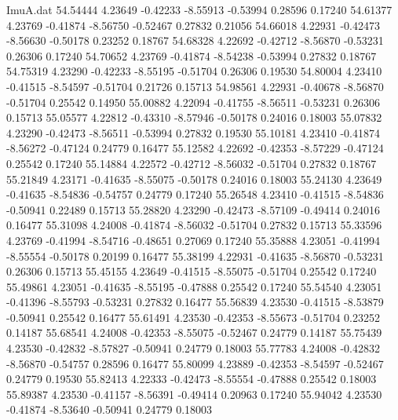 \begin{filecontents}{ImuA.dat}
  54.54444    4.23649   -0.42233   -8.55913   -0.53994    0.28596    0.17240
  54.61377    4.23769   -0.41874   -8.56750   -0.52467    0.27832    0.21056
  54.66018    4.22931   -0.42473   -8.56630   -0.50178    0.23252    0.18767
  54.68328    4.22692   -0.42712   -8.56870   -0.53231    0.26306    0.17240
  54.70652    4.23769   -0.41874   -8.54238   -0.53994    0.27832    0.18767
  54.75319    4.23290   -0.42233   -8.55195   -0.51704    0.26306    0.19530
  54.80004    4.23410   -0.41515   -8.54597   -0.51704    0.21726    0.15713
  54.98561    4.22931   -0.40678   -8.56870   -0.51704    0.25542    0.14950
  55.00882    4.22094   -0.41755   -8.56511   -0.53231    0.26306    0.15713
  55.05577    4.22812   -0.43310   -8.57946   -0.50178    0.24016    0.18003
  55.07832    4.23290   -0.42473   -8.56511   -0.53994    0.27832    0.19530
  55.10181    4.23410   -0.41874   -8.56272   -0.47124    0.24779    0.16477
  55.12582    4.22692   -0.42353   -8.57229   -0.47124    0.25542    0.17240
  55.14884    4.22572   -0.42712   -8.56032   -0.51704    0.27832    0.18767
  55.21849    4.23171   -0.41635   -8.55075   -0.50178    0.24016    0.18003
  55.24130    4.23649   -0.41635   -8.54836   -0.54757    0.24779    0.17240
  55.26548    4.23410   -0.41515   -8.54836   -0.50941    0.22489    0.15713
  55.28820    4.23290   -0.42473   -8.57109   -0.49414    0.24016    0.16477
  55.31098    4.24008   -0.41874   -8.56032   -0.51704    0.27832    0.15713
  55.33596    4.23769   -0.41994   -8.54716   -0.48651    0.27069    0.17240
  55.35888    4.23051   -0.41994   -8.55554   -0.50178    0.20199    0.16477
  55.38199    4.22931   -0.41635   -8.56870   -0.53231    0.26306    0.15713
  55.45155    4.23649   -0.41515   -8.55075   -0.51704    0.25542    0.17240
  55.49861    4.23051   -0.41635   -8.55195   -0.47888    0.25542    0.17240
  55.54540    4.23051   -0.41396   -8.55793   -0.53231    0.27832    0.16477
  55.56839    4.23530   -0.41515   -8.53879   -0.50941    0.25542    0.16477
  55.61491    4.23530   -0.42353   -8.55673   -0.51704    0.23252    0.14187
  55.68541    4.24008   -0.42353   -8.55075   -0.52467    0.24779    0.14187
  55.75439    4.23530   -0.42832   -8.57827   -0.50941    0.24779    0.18003
  55.77783    4.24008   -0.42832   -8.56870   -0.54757    0.28596    0.16477
  55.80099    4.23889   -0.42353   -8.54597   -0.52467    0.24779    0.19530
  55.82413    4.22333   -0.42473   -8.55554   -0.47888    0.25542    0.18003
  55.89387    4.23530   -0.41157   -8.56391   -0.49414    0.20963    0.17240
  55.94042    4.23530   -0.41874   -8.53640   -0.50941    0.24779    0.18003

\end{filecontents}
